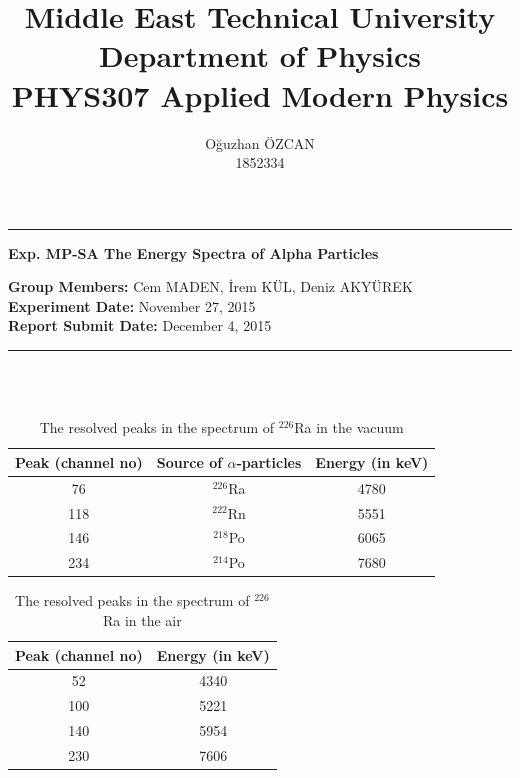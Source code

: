 \documentclass[a4paper,12pt]{article}
\title{Middle East Technical University\\Department of Physics\\\textbf{PHYS307 Applied Modern Physics}}
\author{Oğuzhan ÖZCAN\\1852334}
\date{}
\providecommand{\groupmember}[1]{\textbf{Group Members:} }
\providecommand{\expdate}[1]{\textbf{Experiment Date:} }
\providecommand{\repdate}[1]{\textbf{Report Submit Date:} }
\providecommand{\expname}[1]{\textbf{Exp. MP-SA The Energy Spectra of Alpha Particles} }
\begin{document}
\maketitle

\thispagestyle{fancy}

\noindent\rule{18.4cm}{0.8pt}
\begin{center}
	\expname{arg1}{}
\end{center}
\groupmember{arg1}{Cem MADEN, İrem KÜL, Deniz AKYÜREK}\\
\expdate{November 6, 2015}{November 27, 2015}\\
\repdate{arg1}{December 4, 2015}\\
\noindent\rule{18.4cm}{0.8pt}\\\\
\begin{table}[h!]
	\begin{center}
	\begin{tabular}{|c|c|c|}
	\hline Peak (channel no) & Source of $\alpha$-particles & Energy (in keV) \\ 
	\hline 76 & $^{226}$Ra & 4780 \\ 
	\hline 118 & $^{222}$Rn & 5551 \\ 
	\hline 146 & $^{218}$Po & 6065 \\ 
	\hline 234 & $^{214}$Po & 7680 \\ 
	\hline 
\end{tabular}
\caption{The resolved peaks in the spectrum of $^{226}$Ra in the vacuum}
\end{center}
\end{table}

\begin{table}[h!]
\begin{center}
		\begin{tabular}{|c|c|}
	\hline Peak (channel no) & Energy (in keV) \\ 
	\hline 52 & 4340 \\ 
	\hline 100 & 5221 \\ 
	\hline 140 & 5954 \\ 
	\hline 230 & 7606 \\ 
	\hline 
	\end{tabular}
	\caption{The resolved peaks in the spectrum of $^{226}$Ra in the air}
\end{center}
\end{table}
\end{document}
